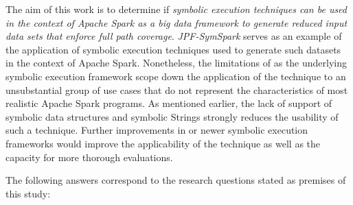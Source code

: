 The aim of this work is to  determine if \textit{symbolic execution techniques can be used in the context of Apache Spark as a big data framework to generate reduced input data sets that enforce full path coverage}. \textit{JPF-SymSpark} serves as an example of the application of symbolic execution techniques used to generate such datasets in the context of Apache Spark. Nonetheless, the limitations of \spf{} as the underlying symbolic execution framework scope down the application of the technique to an unsubstantial group of use cases that do not represent the characteristics of most realistic Apache Spark programs. As mentioned earlier, the lack of support of symbolic data structures and symbolic Strings strongly reduces the usability of such a technique. Further improvements in \spf{} or newer symbolic execution frameworks would improve the applicability of the technique as well as the capacity for more thorough evaluations.

The following answers correspond to the research questions stated as premises of this study:

